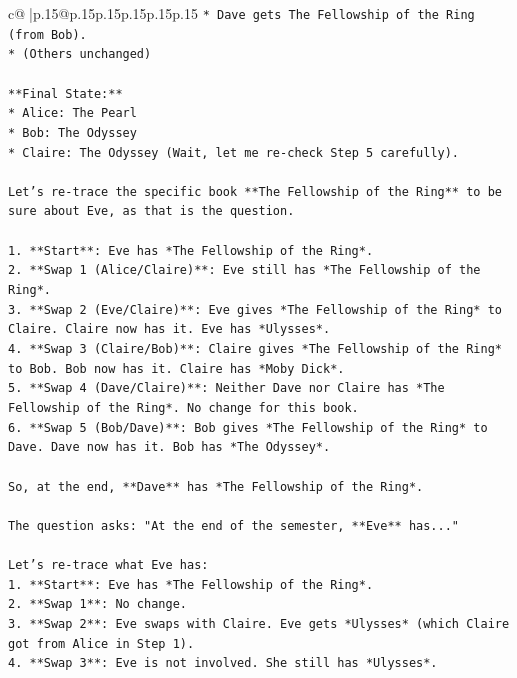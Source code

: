 \documentclass{article}
\begin{document}
{\begin{supertabular}{c@{$\;$}|p{.15\linewidth}@{}p{.15\linewidth}p{.15\linewidth}p{.15\linewidth}p{.15\linewidth}p{.15\linewidth}}
{{{\texttt{*   Dave gets The Fellowship of the Ring (from Bob).} \\
\texttt{*   (Others unchanged)} \\
\\ 
\texttt{**Final State:**} \\
\texttt{*   Alice: The Pearl} \\
\texttt{*   Bob: The Odyssey} \\
\texttt{*   Claire: The Odyssey (Wait, let me re{-}check Step 5 carefully).} \\
\\ 
\texttt{Let's re{-}trace the specific book **The Fellowship of the Ring** to be sure about Eve, as that is the question.} \\
\\ 
\texttt{1.  **Start**: Eve has *The Fellowship of the Ring*.} \\
\texttt{2.  **Swap 1 (Alice/Claire)**: Eve still has *The Fellowship of the Ring*.} \\
\texttt{3.  **Swap 2 (Eve/Claire)**: Eve gives *The Fellowship of the Ring* to Claire. Claire now has it. Eve has *Ulysses*.} \\
\texttt{4.  **Swap 3 (Claire/Bob)**: Claire gives *The Fellowship of the Ring* to Bob. Bob now has it. Claire has *Moby Dick*.} \\
\texttt{5.  **Swap 4 (Dave/Claire)**: Neither Dave nor Claire has *The Fellowship of the Ring*. No change for this book.} \\
\texttt{6.  **Swap 5 (Bob/Dave)**: Bob gives *The Fellowship of the Ring* to Dave. Dave now has it. Bob has *The Odyssey*.} \\
\\ 
\texttt{So, at the end, **Dave** has *The Fellowship of the Ring*.} \\
\\ 
\texttt{The question asks: "At the end of the semester, **Eve** has..."} \\
\\ 
\texttt{Let's re{-}trace what Eve has:} \\
\texttt{1.  **Start**: Eve has *The Fellowship of the Ring*.} \\
\texttt{2.  **Swap 1**: No change.} \\
\texttt{3.  **Swap 2**: Eve swaps with Claire. Eve gets *Ulysses* (which Claire got from Alice in Step 1).} \\
\texttt{4.  **Swap 3**: Eve is not involved. She still has *Ulysses*.} \\
}}}
\end{supertabular}}
\end{document}
